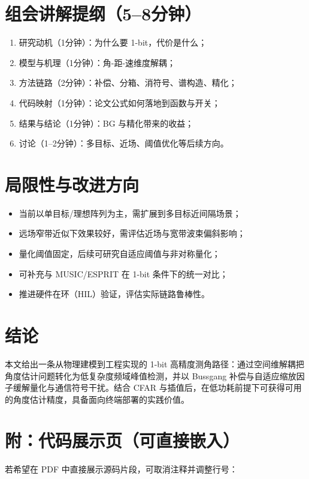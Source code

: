 \documentclass[12pt,a4paper]{ctexart}
\begin{document}
\section{组会讲解提纲（5--8分钟）}
\begin{enumerate}
  \item 研究动机（1分钟）：为什么要 1-bit，代价是什么；
  \item 模型与机理（1分钟）：角-距-速维度解耦；
  \item 方法链路（2分钟）：补偿、分箱、消符号、谱构造、精化；
  \item 代码映射（1分钟）：论文公式如何落地到函数与开关；
  \item 结果与结论（1分钟）：BG 与精化带来的收益；
  \item 讨论（1--2分钟）：多目标、近场、阈值优化等后续方向。
\end{enumerate}

\section{局限性与改进方向}
\begin{itemize}
  \item 当前以单目标/理想阵列为主，需扩展到多目标近间隔场景；
  \item 远场窄带近似下效果较好，需评估近场与宽带波束偏斜影响；
  \item 量化阈值固定，后续可研究自适应阈值与非对称量化；
  \item 可补充与 MUSIC/ESPRIT 在 1-bit 条件下的统一对比；
  \item 推进硬件在环（HIL）验证，评估实际链路鲁棒性。
\end{itemize}

\section{结论}
本文给出一条从物理建模到工程实现的 1-bit 高精度测角路径：通过空间维解耦把角度估计问题转化为低复杂度频域峰值检测，并以 Bussgang 补偿与自适应缩放因子缓解量化与通信符号干扰。结合 CFAR 与插值后，在低功耗前提下可获得可用的角度估计精度，具备面向终端部署的实践价值。

\section*{附：代码展示页（可直接嵌入）}
\noindent 若希望在 PDF 中直接展示源码片段，可取消注释并调整行号：

% 
% 
% 
\end{document}

